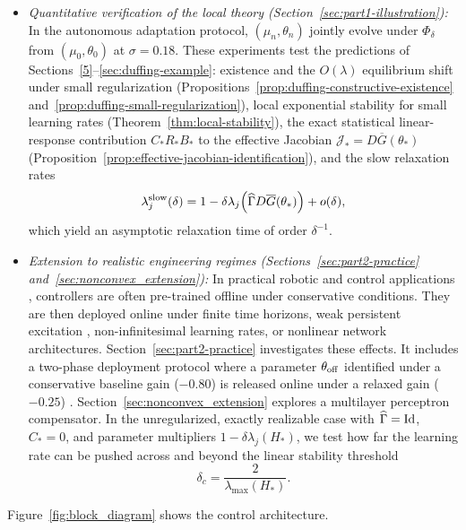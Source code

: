 \begin{itemize}
    \item \emph{Quantitative verification of the local theory (Section~\ref{sec:part1-illustration}):} In the autonomous adaptation protocol, $(\mu_n,\theta_n)$ jointly evolve under $\Phi_\delta$ from $(\mu_0,\theta_0)$ at $\sigma=0.18$. These experiments test the predictions of Sections~\ref{5}--\ref{sec:duffing-example}: existence and the $O(\lambda)$ equilibrium shift under small regularization (Propositions~\ref{prop:duffing-constructive-existence} and~\ref{prop:duffing-small-regularization}), local exponential stability for small learning rates (Theorem~\ref{thm:local-stability}), the exact statistical linear-response contribution $C_*R_*B_*$ to the effective Jacobian $\mathcal J_* = D\overline G(\theta_*)$ (Proposition~\ref{prop:effective-jacobian-identification}), and the slow relaxation rates
    \[
      \lambda_j^{\rm slow}(\delta)
      =
      1-\delta\lambda_j\!\left(
        \widehat{\Gamma} D\overline G(\theta_*)
      \right)+o(\delta),
    \]
    which yield an asymptotic relaxation time of order $\delta^{-1}$.
    \item \emph{Extension to realistic engineering regimes (Sections~\ref{sec:part2-practice} and~\ref{sec:nonconvex_extension}):} In practical robotic and control applications \cite{lippi2018prediction,lippi2021icinco,DulacArnoldEtAl2021,BrunkeEtAl2022}, controllers are often pre-trained offline under conservative conditions. They are then deployed online under finite time horizons, weak persistent excitation \cite{AnnaswamyFradkov2021,VernadeEtAl2026}, non-infinitesimal learning rates, or nonlinear network architectures. Section~\ref{sec:part2-practice} investigates these effects. It includes a two-phase deployment protocol where a parameter $\theta_{\rm off}$ identified under a conservative baseline gain ($-0.80$) is released online under a relaxed gain ($-0.25$) \cite{LippiActionError}. Section~\ref{sec:nonconvex_extension} explores a multilayer perceptron compensator. In the unregularized, exactly realizable case with $\widehat{\Gamma}=\mathrm{Id}$, $C_*=0$, and parameter multipliers $1-\delta\lambda_j(H_*)$, we test how far the learning rate can be pushed across and beyond the linear stability threshold
    \[
      \delta_c=\frac{2}{\lambda_{\max}(H_*)}.
    \]
\end{itemize}

Figure~\ref{fig:block_diagram} shows the control architecture.

